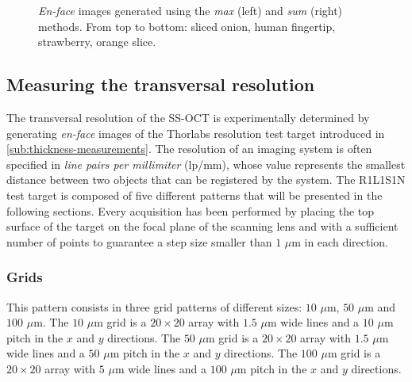 \begin{figure}[hbt]
	\caption{\emph{En-face} images generated using the \emph{max} (left) and \emph{sum} (right) methods. From top to bottom: sliced onion, human fingertip, strawberry, orange slice.}\label{fig:enface-examples}
\end{figure}
%
%
%
%
%
%
%


\FloatBarrier
\subsection{Measuring the transversal resolution}
The transversal resolution of the SS-OCT is experimentally determined by generating \emph{en-face} images of the Thorlabs resolution test target introduced in \autoref{sub:thickness-measurements}. The resolution of an imaging system is often specified in \emph{line pairs per millimiter} (lp/mm), whose value represents the smallest distance between two objects that can be registered by the system. The R1L1S1N test target is composed of five different patterns that will be presented in the following sections. Every acquisition has been performed by placing the top surface of the target on the focal plane of the scanning lens and with a sufficient number of points to guarantee a step size smaller than $1$ $\mu$m in each direction. 

\subsubsection{Grids}
This pattern consists in three grid patterns of different sizes: $10$ $\mu$m, $50$ $\mu$m and $100$ $\mu$m. The $10$ $\mu$m grid is a $20\times 20$ array with $1.5$ $\mu$m wide lines and a $10$ $\mu$m pitch in the $x$ and $y$ directions. The $50$ $\mu$m grid is a $20\times 20$ array with $1.5$ $\mu$m wide lines and a $50$ $\mu$m pitch in the $x$ and $y$ directions. The $100$ $\mu$m grid is a $20\times 20$ array with $5$ $\mu$m wide lines and a $100$ $\mu$m pitch in the $x$ and $y$ directions. 

